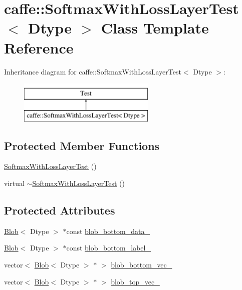 \hypertarget{classcaffe_1_1_softmax_with_loss_layer_test}{\section{caffe\+:\+:Softmax\+With\+Loss\+Layer\+Test$<$ Dtype $>$ Class Template Reference}
\label{classcaffe_1_1_softmax_with_loss_layer_test}
}
Inheritance diagram for caffe\+:\+:Softmax\+With\+Loss\+Layer\+Test$<$ Dtype $>$\+:\begin{figure}[H]
\begin{center}
\leavevmode
\includegraphics[height=2.000000cm]{classcaffe_1_1_softmax_with_loss_layer_test}
\end{center}
\end{figure}
\subsection*{Protected Member Functions}
\begin{DoxyCompactItemize}
\item 
\hyperlink{classcaffe_1_1_softmax_with_loss_layer_test_a97919495d3118717af729bbf5b5ce3f3}{Softmax\+With\+Loss\+Layer\+Test} ()
\item 
virtual \hyperlink{classcaffe_1_1_softmax_with_loss_layer_test_a49bd9fb3001ebba1635b98138b308311}{$\sim$\+Softmax\+With\+Loss\+Layer\+Test} ()
\end{DoxyCompactItemize}
\subsection*{Protected Attributes}
\begin{DoxyCompactItemize}
\item 
\hyperlink{classcaffe_1_1_blob}{Blob}$<$ Dtype $>$ $\ast$const \hyperlink{classcaffe_1_1_softmax_with_loss_layer_test_a721c2ff4fd9ab7412df32c9c05312e8b}{blob\+\_\+bottom\+\_\+data\+\_\+}
\item 
\hyperlink{classcaffe_1_1_blob}{Blob}$<$ Dtype $>$ $\ast$const \hyperlink{classcaffe_1_1_softmax_with_loss_layer_test_ac1e54f604f9677d369902ed78a7e7a7b}{blob\+\_\+bottom\+\_\+label\+\_\+}
\item 
vector$<$ \hyperlink{classcaffe_1_1_blob}{Blob}$<$ Dtype $>$ $\ast$ $>$ \hyperlink{classcaffe_1_1_softmax_with_loss_layer_test_a49effa55c84063f059bb43eb29ae7684}{blob\+\_\+bottom\+\_\+vec\+\_\+}
\item 
vector$<$ \hyperlink{classcaffe_1_1_blob}{Blob}$<$ Dtype $>$ $\ast$ $>$ \hyperlink{classcaffe_1_1_softmax_with_loss_layer_test_a89408418439c9e11ef924b1c932980cd}{blob\+\_\+top\+\_\+vec\+\_\+}
\end{DoxyCompactItemize}


